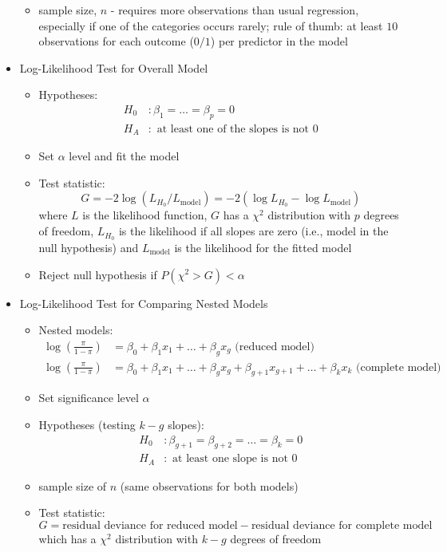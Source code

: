 \documentclass[12pt]{article}
\begin{document}
\begin{itemize}
\begin{itemize}
\item sample size, $n$ - requires more observations than usual regression, especially if one of the categories occurs rarely; rule of thumb: at least $10$ observations for each outcome ($0/1$) per predictor in the model \end{itemize} 
\item Log-Likelihood Test for Overall Model \begin{itemize} 
\item Hypotheses: $$ \begin{aligned} H_0 &: \beta_1 = \dots = \beta_p = 0 \\ H_A &: \text{ at least one of the slopes is not $0$} \end{aligned} $$ 
\item Set $\alpha$ level and fit the model
\item Test statistic: $$ G = -2\log(L_{H_0} / L_{\text{model}}) = -2(\log L_{H_0} - \log L_{\text{model}}) $$ where $L$ is the likelihood function, $G$ has a $\chi^2$ distribution with $p$ degrees of freedom, $L_{H_0}$ is the likelihood if all slopes are zero (i.e., model in the null hypothesis) and $L_{\text{model}}$ is the likelihood for the fitted model
\item Reject null hypothesis if $P(\chi^2 > G) < \alpha$ \end{itemize} 
\item Log-Likelihood Test for Comparing Nested Models \begin{itemize} 
\item Nested models: $$ \begin{aligned} \log\left( \frac{\pi}{1-\pi} \right) &= \beta_0 + \beta_1x_1 + \dots + \beta_gx_g \text{ (reduced model) } \\ \log \left( \frac{\pi}{1-\pi} \right) &= \beta_0 + \beta_1x_1 + \dots + \beta_gx_g + \beta_{g+1}x_{g+1} + \dots + \beta_kx_k \text{ (complete model) } \end{aligned} $$ 
\item Set significance level $\alpha$
\item Hypotheses (testing $k-g$ slopes): $$ \begin{aligned} H_0 &: \beta_{g+1} = \beta_{g+2} = \dots = \beta_k = 0 \\ H_A &: \text{ at least one slope is not $0$} \end{aligned} $$ 
\item sample size of $n$ (same observations for both models) 
\item Test statistic: $$G = \text{residual deviance for reduced model} - \text{residual deviance for complete model } $$ which has a $\chi^2$ distribution with $k-g$ degrees of freedom

\end{itemize}
\end{itemize}
\end{document}

